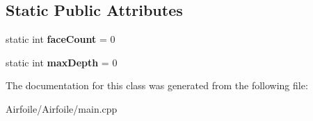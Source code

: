 \subsection*{Static Public Attributes}
\begin{DoxyCompactItemize}
\item 
\mbox{\label{class_face_ac9608ba7632813efc28189444a5d62ed}} 
static int {\bfseries face\+Count} = 0
\item 
\mbox{\label{class_face_a4d5f06a0765b7228f3c2789da7fcd66c}} 
static int {\bfseries max\+Depth} = 0
\end{DoxyCompactItemize}


The documentation for this class was generated from the following file\+:\begin{DoxyCompactItemize}
\item 
Airfoile/\+Airfoile/main.\+cpp\end{DoxyCompactItemize}

